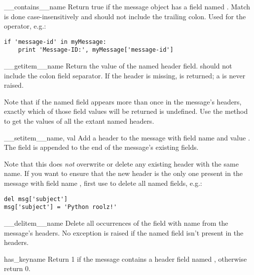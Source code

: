 \begin{methoddesc}[Message]{__contains__}{name}
Return true if the message object has a field named .
Match is done case-insensitively and  should not include the
trailing colon.  Used for the  operator,
e.g.:

\begin{verbatim}
if 'message-id' in myMessage:
    print 'Message-ID:', myMessage['message-id']
\end{verbatim}
\end{methoddesc}

\begin{methoddesc}[Message]{__getitem__}{name}
Return the value of the named header field.   should not
include the colon field separator.  If the header is missing,
 is returned; a  is never raised.

Note that if the named field appears more than once in the message's
headers, exactly which of those field values will be returned is
undefined.  Use the  method to get the values of all
the extant named headers.
\end{methoddesc}

\begin{methoddesc}[Message]{__setitem__}{name, val}
Add a header to the message with field name  and value
.  The field is appended to the end of the message's existing
fields.

Note that this does \emph{not} overwrite or delete any existing header
with the same name.  If you want to ensure that the new header is the
only one present in the message with field name
, first use  to delete all named
fields, e.g.:

\begin{verbatim}
del msg['subject']
msg['subject'] = 'Python roolz!'
\end{verbatim}
\end{methoddesc}

\begin{methoddesc}[Message]{__delitem__}{name}
Delete all occurrences of the field with name  from the
message's headers.  No exception is raised if the named field isn't
present in the headers.
\end{methoddesc}

\begin{methoddesc}[Message]{has_key}{name}
Return 1 if the message contains a header field named ,
otherwise return 0.
\end{methoddesc}

